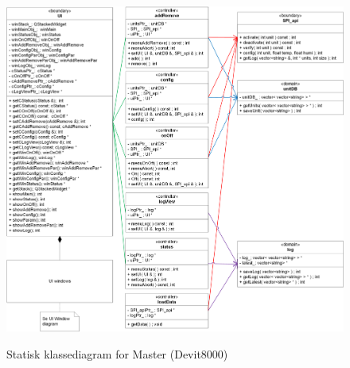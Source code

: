 
\begin{figure}[!htbp] \centering
{\includegraphics[scale=0.7]{filer/design/sw_class_devkit_static}}
\caption{Statisk klassediagram for Master (Devit8000)}
\label{fig:class_static_dev}
\end{figure}

